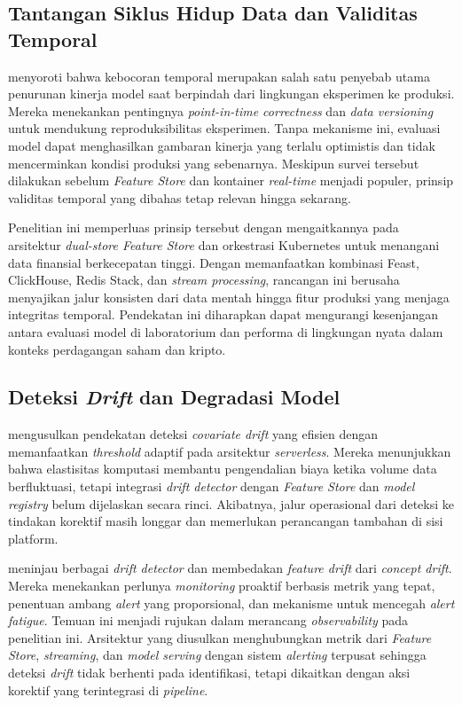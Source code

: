 \subsection{Tantangan Siklus Hidup Data dan Validitas Temporal}

\textcite{polyzotis2018data} menyoroti bahwa kebocoran temporal merupakan salah satu penyebab utama penurunan kinerja model saat berpindah dari lingkungan eksperimen ke produksi. Mereka menekankan pentingnya \textit{point-in-time correctness} dan \textit{data versioning} untuk mendukung reproduksibilitas eksperimen. Tanpa mekanisme ini, evaluasi model dapat menghasilkan gambaran kinerja yang terlalu optimistis dan tidak mencerminkan kondisi produksi yang sebenarnya. Meskipun survei tersebut dilakukan sebelum \textit{Feature Store} dan kontainer \textit{real-time} menjadi populer, prinsip validitas temporal yang dibahas tetap relevan hingga sekarang.

Penelitian ini memperluas prinsip tersebut dengan mengaitkannya pada arsitektur \textit{dual-store Feature Store} dan orkestrasi Kubernetes untuk menangani data finansial berkecepatan tinggi. Dengan memanfaatkan kombinasi Feast, ClickHouse, Redis Stack, dan \textit{stream processing}, rancangan ini berusaha menyajikan jalur konsisten dari data mentah hingga fitur produksi yang menjaga integritas temporal. Pendekatan ini diharapkan dapat mengurangi kesenjangan antara evaluasi model di laboratorium dan performa di lingkungan nyata dalam konteks perdagangan saham dan kripto.

\subsection{Deteksi \textit{Drift} dan Degradasi Model}

\textcite{cespedes2024efficient} mengusulkan pendekatan deteksi \textit{covariate drift} yang efisien dengan memanfaatkan \textit{threshold} adaptif pada arsitektur \textit{serverless}. Mereka menunjukkan bahwa elastisitas komputasi membantu pengendalian biaya ketika volume data berfluktuasi, tetapi integrasi \textit{drift detector} dengan \textit{Feature Store} dan \textit{model registry} belum dijelaskan secara rinci. Akibatnya, jalur operasional dari deteksi ke tindakan korektif masih longgar dan memerlukan perancangan tambahan di sisi platform.

\textcite{bayram2022concept} meninjau berbagai \textit{drift detector} dan membedakan \textit{feature drift} dari \textit{concept drift}. Mereka menekankan perlunya \textit{monitoring} proaktif berbasis metrik yang tepat, penentuan ambang \textit{alert} yang proporsional, dan mekanisme untuk mencegah \textit{alert fatigue}. Temuan ini menjadi rujukan dalam merancang \textit{observability} pada penelitian ini. Arsitektur yang diusulkan menghubungkan metrik dari \textit{Feature Store}, \textit{streaming}, dan \textit{model serving} dengan sistem \textit{alerting} terpusat sehingga deteksi \textit{drift} tidak berhenti pada identifikasi, tetapi dikaitkan dengan aksi korektif yang terintegrasi di \textit{pipeline}.

